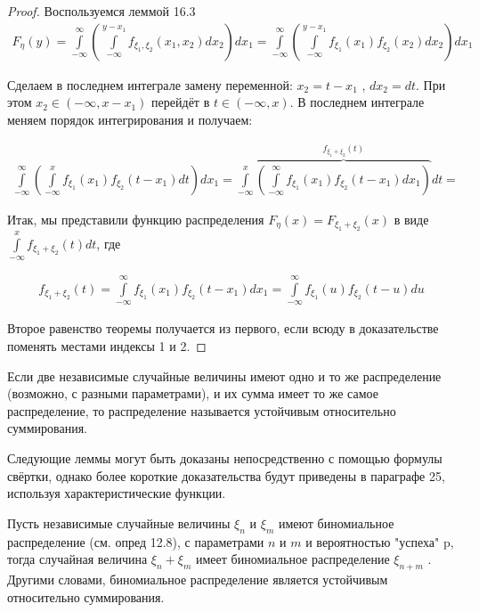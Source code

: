 \begin{proof}
Воспользуемся леммой 16.3
\begin{gather*}
	F_\eta (y) =
	\int\limits_{-\infty}^{\infty}\left(
		\int\limits_{-\infty}^{y-x_1 } f_{\xi_1,\xi_2} (x_1 , x_2 ) dx_2
	\right)dx_1=
	\int\limits_{-\infty}^{\infty}\left(
		\int\limits_{-\infty}^{y-x_1 } f_{\xi_1}(x_1)f_{\xi_2}(x_2) dx_2
	\right)dx_1
\end{gather*}

Сделаем в последнем интеграле замену переменной: $x_2 = t - x_1$ , $dx_2 = dt$.
При этом $x_2 \in (-\infty, x - x_1 )$ перейдёт в $t \in (-\infty, x)$. В последнем интеграле меняем порядок интегрирования и получаем:

\begin{gather*}
	\int\limits_{-\infty}^{\infty}\left(
		\int\limits_{-\infty}^{x} f_{\xi_1}(x_1)f_{\xi_2}(t-x_1) dt
	\right)dx_1=
	\int\limits_{-\infty}^{x}\overbrace{\left(
		\int\limits_{-\infty}^{\infty} f_{\xi_1}(x_1)f_{\xi_2}(t-x_1) dx_1
	\right)}^{f_{\xi_1+\xi_2}(t)}dt=
\end{gather*}

Итак, мы представили функцию распределения $F_\eta (x) = F_{\xi_1 +\xi_2} (x)$ в виде $\int\limits_{-\infty}^{x} f_{\xi_1 +\xi_2} (t) dt$, где

\begin{gather*}
	f_{\xi_1 +\xi_2} (t)=\int\limits_{-\infty}^{\infty} f_{\xi_1}(x_1)f_{\xi_2}(t-x_1) dx_1=\int\limits_{-\infty}^{\infty} f_{\xi_1}(u)f_{\xi_2}(t-u) du
\end{gather*}

Второе равенство теоремы получается из первого, если всюду в доказательстве поменять местами индексы 1 и 2.
\end{proof}

\begin{definition}
Если две независимые случайные величины имеют одно и то же распределение (возможно, с разными параметрами), и их сумма имеет то же самое распределение, то распределение называется устойчивым относительно суммирования.
\end{definition}

\begin{zam}
Следующие леммы могут быть доказаны непосредственно с помощью формулы свёртки, однако более короткие доказательства будут приведены в параграфе 25, используя характеристические функции.
\end{zam}

\begin{lemma}
	Пусть независимые случайные величины $\xi_n$ и $\xi_m$ имеют
биномиальное распределение (см. опред 12.8), с параметрами $n$ и $m$ и вероятностью "успеха" p, тогда случайная величина $\xi_n + \xi_m$ имеет биномиальное распределение $\xi_{n+m}$ . Другими словами, биномиальное распределение является устойчивым относительно суммирования.
\end{lemma}

